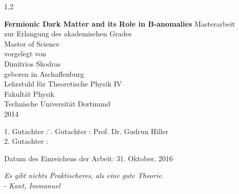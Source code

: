\documentclass[11pt,a4paper,twoside]{article}
\begin{document}
\begin{spacing}{1,2}

%
%


\newcommand{\thetitle}{Fermionic Dark Matter and its Role in B-anomalies}

\thispagestyle{empty}
\begin{center}

\Huge\textbf{\thetitle}
\vfill
\vfill
\Large
Masterarbeit\\ zur Erlangung des akademischen Grades \\ Master of Science \\
\vspace{20pt}
\normalsize
vorgelegt von \\[5pt]
{\Large Dimitrios Skodras} \\[5pt]
geboren in Aschaffenburg \\
\vspace{20pt}
Lehrstuhl für Theoretische Physik IV \\ Fakultät Physik \\
Technische Universität Dortmund \\ 2014
\end{center}
\newpage

\thispagestyle{empty}
\vspace*{\fill}
\begin{tabbing}
1. Gutachter : \=. Gutachter : \>Prof. Dr. Gudrun Hiller \\[11pt]
2. Gutachter : \> \\[11pt]
\end{tabbing}
\vspace{11pt}
Datum des Einreichens der Arbeit: 31. Oktober, 2016
\newpage
\thispagestyle{empty}
\begin{flushright} 
\textit{\grqq Es gibt nichts Praktischeres, als eine gute Theorie.\grqq}\\
- \textit{Kant, Immanuel}\\
\vspace{2cm}
\end{flushright}


\end{spacing}
\end{document}
